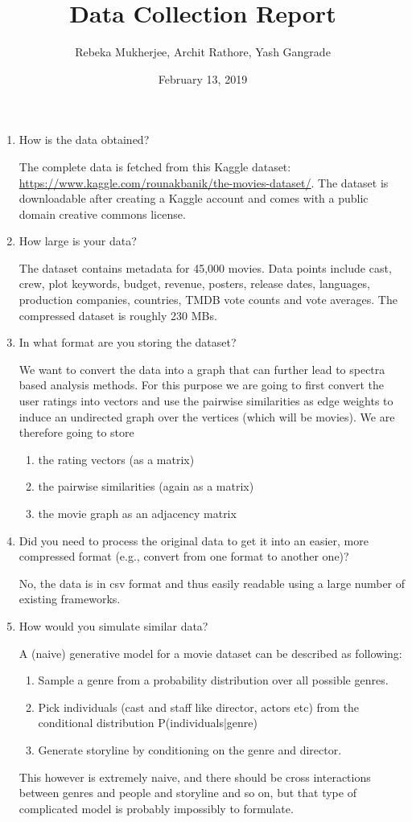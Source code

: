 \documentclass[11pt]{article}
\title{Data Collection Report}
\author{Rebeka Mukherjee, Archit Rathore, Yash Gangrade}
\date{February 13, 2019}
\begin{document}
\maketitle

\begin{enumerate}
\item How is the data obtained?

The complete data is fetched from this Kaggle dataset: \url{https://www.kaggle.com/rounakbanik/the-movies-dataset/}. The dataset is downloadable after creating a Kaggle account and comes with a public domain creative commons license.

\item How large is your data?

The dataset contains metadata for 45,000 movies. Data points include cast, crew, plot keywords, budget, revenue, posters, release dates, languages, production companies, countries, TMDB vote counts and vote averages. The compressed dataset is roughly 230 MBs.

\item In what format are you storing the dataset?

We want to convert the data into a graph that can further lead to spectra based analysis methods. For this purpose we are going to first convert the user ratings into vectors and use the pairwise similarities as edge weights to induce an undirected graph over the vertices (which will be movies). We are therefore going to store
\begin{enumerate}
	\item the rating vectors (as a matrix)
	\item the pairwise similarities (again as a matrix)
	\item the movie graph as an adjacency matrix
\end{enumerate}

\item Did you need to process the original data to get it into an easier, more compressed format (e.g., convert from one format to another one)?

No, the data is in csv format and thus easily readable using a large number of existing frameworks.

\item How would you simulate similar data?

A (naive) generative model for a movie dataset can be described as following:
\begin{enumerate}
	\item Sample a genre from a probability distribution over all possible genres.
	\item Pick individuals (cast and staff like director, actors etc) from the conditional distribution P(individuals|genre)
	\item Generate storyline by conditioning on the genre and director.
\end{enumerate}
This however is extremely naive, and there should be cross interactions between genres and people and storyline and so on, but that type of complicated model is probably impossibly to formulate.

\end{enumerate}
\end{document}
